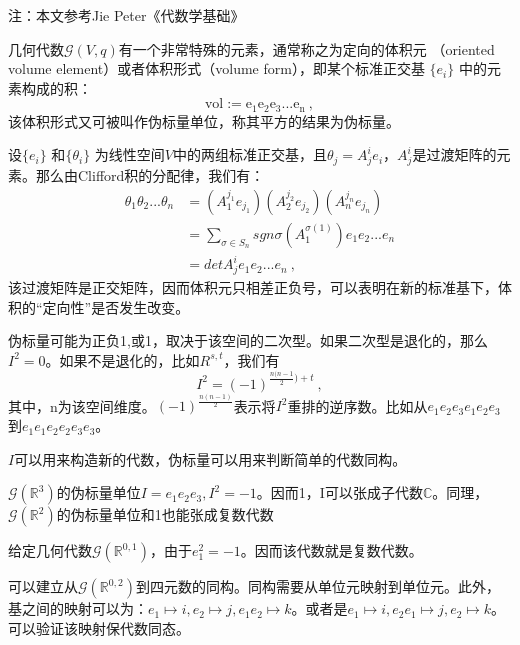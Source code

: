 
注：本文参考Jie Peter《代数学基础》

几何代数$\mathcal G(V,q)$有一个非常特殊的元素，通常称之为定向的体积元
（oriented volume element）或者体积形式（volume form），即某个标准正交基 $\{e_i\}$ 中的元素构成的积：
$$\mathrm {vol:=e_1e_2e_3...e_n}~,$$
该体积形式又可被叫作伪标量单位，称其平方的结果为伪标量。

设$\{e_i\}$ 和$\{\theta_i\}$ 为线性空间$V$中的两组标准正交基，且$\theta_j=A^i_j e_i$，$A^i_j$是过渡矩阵的元素。那么由Clifford积的分配律，我们有：
\begin{equation}
\begin{aligned}
\theta_1\theta_2...\theta_n&=(A^{j_1}_1 e_{j_1})(A^{j_2}_2 e_{j_2})(A^{j_n}_n e_{j_n})\\
&=\sum_{\sigma\in S_n} sgn\sigma(A^{\sigma (1)}_1)e_1e_2...e_n\\
&=det A^i_je_1e_2...e_n~,
\end{aligned}
\end{equation}
该过渡矩阵是正交矩阵，因而体积元只相差正负号，可以表明在新的标准基下，体积的“定向性”是否发生改变。

伪标量可能为正负1,或1，取决于该空间的二次型。如果二次型是退化的，那么$I^2=0$。如果不是退化的，比如$R^{s,t}$，我们有
\begin{equation}
I^2=(-1)^{\frac{n(n-1}{2})+t}~,
\end{equation}
其中，n为该空间维度。$(-1)^{\frac{n(n-1)}{2}}$表示将$I^2$重排的逆序数。比如从$e_1e_2e_3e_1e_2e_3$到$e_1e_1e_2e_2e_3e_3$。

$I$可以用来构造新的代数，伪标量可以用来判断简单的代数同构。

\begin{example}{}
$\mathcal G(\mathbb R^3)$的伪标量单位$I=e_1e_2e_3,I^2=-1$。因而{1，I}可以张成子代数$\mathbb C$。同理，$\mathcal G(\mathbb R^2)$的伪标量单位和1也能张成复数代数
\end{example}
\begin{example}{}
给定几何代数$\mathcal G(\mathbb R^{0,1})$，由于$e_1^2=-1$。因而该代数就是复数代数。
\end{example}
\begin{example}{}
可以建立从$\mathcal G(\mathbb R^{0,2})$到四元数的同构。同构需要从单位元映射到单位元。此外，基之间的映射可以为：$e_1\mapsto i,e_2\mapsto j,e_1e_2\mapsto k$。或者是$e_1\mapsto i,e_2 e_1\mapsto j,e_2\mapsto k$。可以验证该映射保代数同态。
\end{example}
